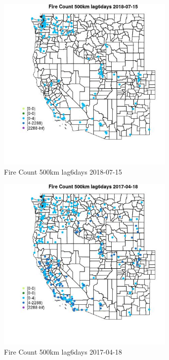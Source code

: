 \begin{figure} 
\centering  
\includegraphics[width=0.77\textwidth]{Code_Outputs/Report_ML_input_PM25_Step4_part_e_de_duplicated_aves_compiled_2019-05-21wNAs_MapObsFire_Count_500km_lag6days2018-07-15.jpg} 
\caption{\label{fig:Report_ML_input_PM25_Step4_part_e_de_duplicated_aves_compiled_2019-05-21wNAsMapObsFire_Count_500km_lag6days2018-07-15}Fire Count 500km lag6days 2018-07-15} 
\end{figure} 
 

\begin{figure} 
\centering  
\includegraphics[width=0.77\textwidth]{Code_Outputs/Report_ML_input_PM25_Step4_part_e_de_duplicated_aves_compiled_2019-05-21wNAs_MapObsFire_Count_500km_lag6days2017-04-18.jpg} 
\caption{\label{fig:Report_ML_input_PM25_Step4_part_e_de_duplicated_aves_compiled_2019-05-21wNAsMapObsFire_Count_500km_lag6days2017-04-18}Fire Count 500km lag6days 2017-04-18} 
\end{figure} 
 

